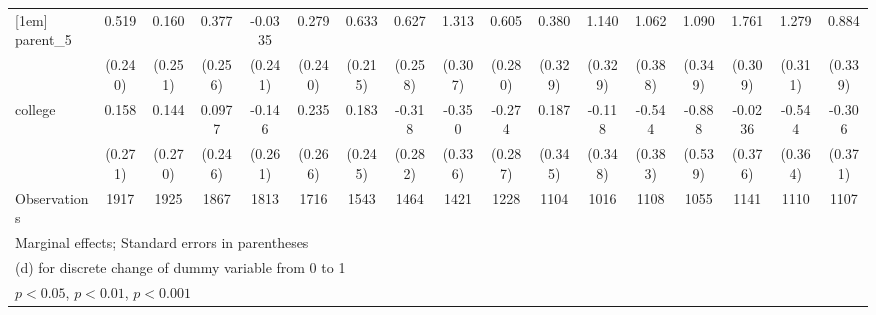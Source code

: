 {\begin{tabular}{l*{16}{c}}
[1em]
parent\_5            &       0.519\sym{*}  &       0.160         &       0.377         &     -0.0335         &       0.279         &       0.633\sym{**} &       0.627\sym{*}  &       1.313\sym{***}&       0.605\sym{*}  &       0.380         &       1.140\sym{***}&       1.062\sym{**} &       1.090\sym{**} &       1.761\sym{***}&       1.279\sym{***}&       0.884\sym{**} \\
                    &     (0.240)         &     (0.251)         &     (0.256)         &     (0.241)         &     (0.240)         &     (0.215)         &     (0.258)         &     (0.307)         &     (0.280)         &     (0.329)         &     (0.329)         &     (0.388)         &     (0.349)         &     (0.309)         &     (0.311)         &     (0.339)         \\
[1em]
college             &       0.158         &       0.144         &      0.0977         &      -0.146         &       0.235         &       0.183         &      -0.318         &      -0.350         &      -0.274         &       0.187         &      -0.118         &      -0.544         &      -0.888         &     -0.0236         &      -0.544         &      -0.306         \\
                    &     (0.271)         &     (0.270)         &     (0.246)         &     (0.261)         &     (0.266)         &     (0.245)         &     (0.282)         &     (0.336)         &     (0.287)         &     (0.345)         &     (0.348)         &     (0.383)         &     (0.539)         &     (0.376)         &     (0.364)         &     (0.371)         \\
\hline
Observations        &        1917         &        1925         &        1867         &        1813         &        1716         &        1543         &        1464         &        1421         &        1228         &        1104         &        1016         &        1108         &        1055         &        1141         &        1110         &        1107         \\
\hline\hline
\multicolumn{17}{l}{\footnotesize Marginal effects; Standard errors in parentheses}\\
\multicolumn{17}{l}{\footnotesize  (d) for discrete change of dummy variable from 0 to 1}\\
\multicolumn{17}{l}{\footnotesize \sym{*} \(p<0.05\), \sym{**} \(p<0.01\), \sym{***} \(p<0.001\)}\\
\end{tabular}
}
